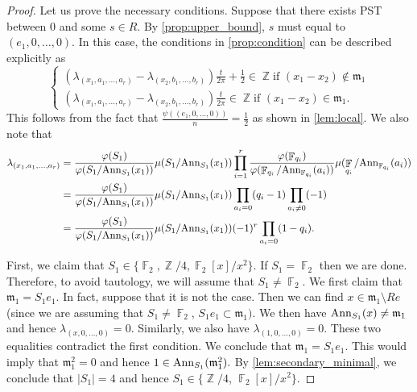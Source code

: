 \documentclass[12pt, a4paper]{amsart}
\theoremstyle{definition}
\DeclareMathOperator{\Z}{\mathbb{Z}}
\DeclareMathOperator{\F}{\mathbb{F}}
\newcommand{\Ann}{{\rm Ann}}
\numberwithin{equation}{section}
\begin{document}
\begin{proof}
    Let us prove the necessary conditions. Suppose that there exists PST between $0$ and some $s \in R.$ By \cref{prop:upper_bound}, $s$ must equal to $(e_1, 0, \ldots, 0).$ In this case, the conditions in \cref{prop:condition} can be described explicitly as 
\begin{equation} \label{eq:conditions}
    \begin{cases}
    (\lambda_{(x_1, a_1, \ldots, a_r)} - \lambda_{(x_2, b_1, \ldots, b_r)}) \frac{t}{2 \pi} + \frac{1}{2} \in \Z  \text{if } (x_1-x_2) \not \in \mathfrak{m}_1 \\ 
    (\lambda_{(x_1, a_1, \ldots, a_r)} - \lambda_{(x_2, b_1, \ldots, b_r)}) \frac{t}{2 \pi}  \in \Z  \text{if  } (x_1-x_2)  \in \mathfrak{m}_1.
\end{cases} 
\end{equation}
This follows from the fact that $\frac{\psi((e_1,0, \ldots, 0))}{n}= \frac{1}{2}$ as shown in \cref{lem:local}. We also note that 
\begin{align*} 
\lambda_{(x_1, a_1, \ldots, a_r)} &= \frac{\varphi(S_1)}{\varphi(S_1/\Ann_{S_1}(x_1))} \mu(S_1/\Ann_{S_1}(x_1)) \prod_{i=1}^r \frac{\varphi(\F_{q_i})}{\varphi(\F_{q_i}/\Ann_{\F_{q_i}}(a_i))} \mu(\F_{q_i}/\Ann_{\F_{q_i}}(a_i)) \\ 
&= \frac{\varphi(S_1)}{\varphi(S_1/\Ann_{S_1}(x_1))} \mu(S_1/\Ann_{S_1}(x_1)) \prod_{a_i =0} (q_i-1) \prod_{a_i \neq 0 }(-1) \\
&= \frac{\varphi(S_1)}{\varphi(S_1/\Ann_{S_1}(x_1))} \mu(S_1/\Ann_{S_1}(x_1)) (-1)^r \prod_{a_i =0} (1-q_i).
\end{align*}



First, we claim that $S_1 \in \{\F_2, \Z/4, \F_2[x]/x^2 \}.$ If $S_1=\F_2$ then we are done. Therefore, to avoid tautology, we will assume that $S_1 \neq \F_2.$ We first claim that $\mathfrak{m}_1=S_1e_1$. In fact, suppose that it is not the case. Then we can find $x \in \mathfrak{m}_1 \setminus Re$ (since we are assuming that $S_1 \neq \F_2$, $S_1e_1 \subset \mathfrak{m}_1).$ We then have $\Ann_{S_1}(x) \neq \mathfrak{m}_1$ and hence $\lambda_{(x,0,\ldots,0)}=0.$ Similarly, we also have $\lambda_{(1,0,\ldots, 0)}=0$. These two equalities contradict the first condition. We conclude that $\mathfrak{m}_1 = S_1 e_1.$ This would imply that $\mathfrak{m}_1^2=0$ and hence $1 \in \Ann_{S_1}(\mathfrak{m}_1^2).$ By \cref{lem:secondary_minimal}, we conclude that $|S_1|=4$ and hence $S_1 \in \{ \Z/4$, $\F_2[x]/x^2 \}.$ 


\end{proof}
\end{document}
